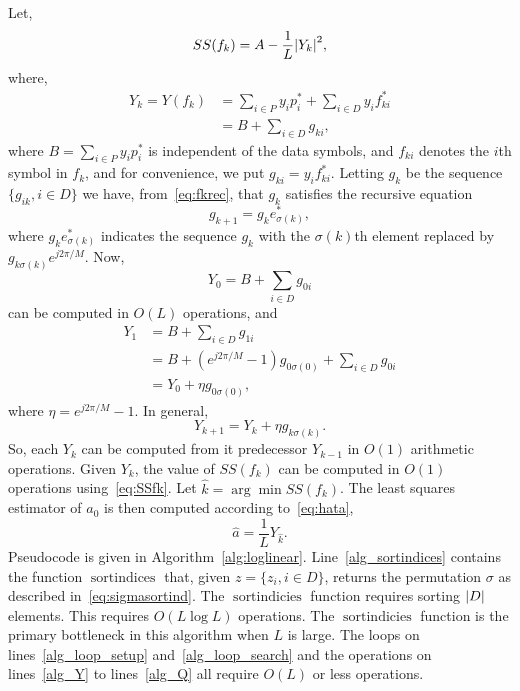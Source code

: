 \documentclass[draftcls, onecolumn, 11pt]{IEEEtran}
\begin{document}
Let,
\begin{equation}\label{eq:SSfk}
SS(f_k) = A - \frac{1}{L}{\left\vert Y_k \right\vert}^2,
\end{equation}
where, 
\begin{align*}
Y_k = Y( f_k ) &= \sum_{i \in P} y_i p_i^*  + \sum_{i \in D} y_i f_{ki}^* \\
&= B + \sum_{i \in D}g_{ki},
\end{align*}
where $B = \sum_{i \in P} y_i p_i^*$ is independent of the data symbols, and $f_{ki}$ denotes the $i$th symbol in $f_k$, and for convenience, we put $g_{ki}  = y_i f_{ki}^*$.  Letting $g_{k}$ be the sequence $\{g_{ik}, i \in D\}$ we have, from~\eqref{eq:fkrec}, that $g_k$ satisfies the recursive equation
\[
g_{k+1} = g_{k} e_{\sigma(k)}^*,
\]
where $g_{k} e_{\sigma(k)}^*$ indicates the sequence $g_k$ with the $\sigma(k)$th element replaced by $g_{k \sigma(k)}e^{j2\pi/M}$.  Now,
\[
Y_0 = B + \sum_{i \in D} g_{0i}
\] 
can be computed in $O(L)$ operations, and
\begin{align*}
Y_1 &= B + \sum_{i \in D} g_{1i} \\
&= B +  (e^{j2\pi/M} - 1)g_{0\sigma(0)} + \sum_{i \in D} g_{0i} \\
&= Y_0 + \eta g_{0\sigma(0)},
\end{align*}
where $\eta = e^{j2\pi/M} - 1$.  In general,
\[
Y_{k+1} = Y_k + \eta g_{k\sigma(k)}.
\]
So, each $Y_k$ can be computed from it predecessor $Y_{k-1}$ in $O(1)$ arithmetic operations.  Given $Y_k$, the value of $SS(f_k)$ can be computed in $O(1)$ operations using~\eqref{eq:SSfk}.  Let $\hat{k} = \arg\min SS(f_k)$.  The least squares estimator of $a_0$ is then computed according to~\eqref{eq:hata},
\begin{equation}\label{eq:ahatYhat}
\hat{a} = \frac{1}{L} Y_{\hat{k}}.
\end{equation}
Pseudocode is given in Algorithm~\ref{alg:loglinear}.  Line~\ref{alg_sortindices} contains the function $\operatorname{sortindices}$ that, given $z = \{z_i, i \in D\}$, returns the permutation $\sigma$ as described in~\eqref{eq:sigmasortind}.  The $\operatorname{sortindicies}$ function requires sorting ${\left\vert D \right\vert}$ elements.  This requires $O(L \log L)$ operations.  The $\operatorname{sortindicies}$ function is the primary bottleneck in this algorithm when $L$ is large.  The loops on lines~\ref{alg_loop_setup} and~\ref{alg_loop_search} and the operations on lines~\ref{alg_Y} to lines~\ref{alg_Q} all require $O(L)$ or less operations.  %
\end{document}
